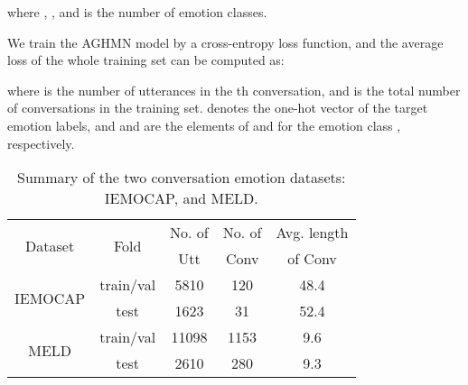 \documentclass[letterpaper]{article} \usepackage{aaai20}  \usepackage{times}  \usepackage{helvet} \usepackage{courier}  \usepackage[hyphens]{url}  \usepackage{graphicx} \urlstyle{rm} \def\UrlFont{\rm}  \usepackage{graphicx}  \frenchspacing  \setlength{\pdfpagewidth}{8.5in}  \setlength{\pdfpageheight}{11in}
\begin{document}
where , , and  is the number of emotion classes.

We train the AGHMN model by a cross-entropy loss function, and the average loss of the whole training set can be computed as:

where  is the number of utterances in the th conversation, and  is the total number of conversations in the training set.  denotes the one-hot vector of the target emotion labels, and  and  are the elements of  and  for the emotion class , respectively.


\begin{table}[t]
\small
\centering
\begin{threeparttable}
\begin{tabular}{c|c|c|c|c}
\toprule
\multirow{2}{*}{Dataset}
& \multirow{2}{*}{Fold}
& \multicolumn{1}{c|}{\footnotesize{No. of}}
& \multicolumn{1}{c|}{\footnotesize{No. of}}
& \multicolumn{1}{c}{\footnotesize{Avg. length}} \\
& & \footnotesize{Utt} & \footnotesize{Conv} & \footnotesize{of Conv} \\
\hline
\hline
\multirow{2}{*}{IEMOCAP}
& train/val & {5810} & 120 & 48.4 \\
& test & {1623} & 31& 52.4 \\
\multirow{2}{*}{MELD}
& train/val & {11098} & {1153}& 9.6 \\
& test & {2610} & 280& 9.3 \\
\bottomrule
\end{tabular}
\end{threeparttable}
\caption{\label{table:datasets}Summary of the two conversation emotion datasets: IEMOCAP, and MELD.}
\end{table}
\end{document}
